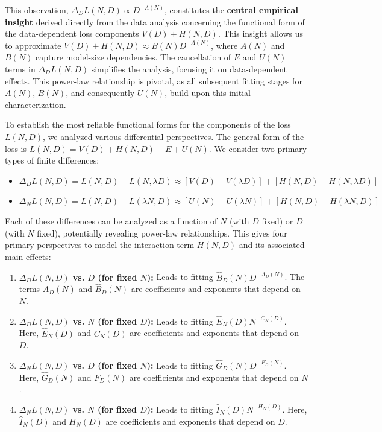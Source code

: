 \documentclass{article}
\begin{document}
This observation, $\Delta_D L(N,D) \propto D^{-A(N)}$, constitutes the \textbf{central empirical insight} derived directly from the data analysis concerning the functional form of the data-dependent loss components $V(D) + H(N,D)$. This insight allows us to approximate $V(D) + H(N,D) \approx B(N)D^{-A(N)}$, where $A(N)$ and $B(N)$ capture model-size dependencies. The cancellation of $E$ and $U(N)$ terms in $\Delta_D L(N,D)$ simplifies the analysis, focusing it on data-dependent effects. This power-law relationship is pivotal, as all subsequent fitting stages for $A(N)$, $B(N)$, and consequently $U(N)$, build upon this initial characterization.

To establish the most reliable functional forms for the components of the loss $L(N,D)$, we analyzed various differential perspectives. The general form of the loss is $L(N, D) = V(D) + H(N,D) + E + U(N)$. We consider two primary types of finite differences:
\begin{itemize}
    \item $\Delta_D L(N,D) = L(N, D) - L(N, \lambda  D) \approx [V(D) - V(\lambda D)] + [H(N, D) - H(N, \lambda D)]$
    \item $\Delta_N L(N,D) = L(N, D) - L(\lambda N, D) \approx [U(N) - U(\lambda N)] + [H(N, D) - H(\lambda N,D)]$
\end{itemize}
Each of these differences can be analyzed as a function of $N$ (with $D$ fixed) or $D$ (with $N$ fixed), potentially revealing power-law relationships. This gives four primary perspectives to model the interaction term $H(N,D)$ and its associated main effects:

\begin{enumerate}
    \item \textbf{$\Delta_D L(N,D)$ vs. $D$ (for fixed $N$):} Leads to fitting $\hat{B}_D(N)D^{-A_D(N)}$. The terms $A_D(N)$ and $\hat{B}_D(N)$ are coefficients and exponents that depend on $N$.
    \item \textbf{$\Delta_D L(N,D)$ vs. $N$ (for fixed $D$):} Leads to fitting $\hat{E}_N(D)N^{-C_N(D)}$. Here, $\hat{E}_N(D)$ and $C_N(D)$ are coefficients and exponents that depend on $D$.
    \item \textbf{$\Delta_N L(N,D)$ vs. $D$ (for fixed $N$):} Leads to fitting $\hat{G}_D(N)D^{-F_D(N)}$. Here, $\hat{G}_D(N)$ and $F_D(N)$ are coefficients and exponents that depend on $N$.
    \item \textbf{$\Delta_N L(N,D)$ vs. $N$ (for fixed $D$):} Leads to fitting $\hat{I}_N(D)N^{-H_N(D)}$. Here, $\hat{I}_N(D)$ and $H_N(D)$ are coefficients and exponents that depend on $D$.
\end{enumerate}
\end{document}
